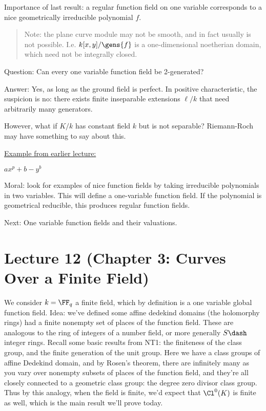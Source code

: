 Importance of last result: a regular function field on one variable
corresponds to a nice geometrically irreducible polynomial \(f\).

\begin{quote}
Note: the plane curve module may not be smooth, and in fact usually is
not possible. I.e. \(k[x ,y]/\gens{f}\) is a one-dimensional noetherian
domain, which need not be integrally closed.
\end{quote}

Question: Can every one variable function field be 2-generated?

Answer: Yes, as long as the ground field is perfect. In positive
characteristic, the suspicion is no: there exists finite inseparable
extensions \(\ell/k\) that need arbitrarily many generators.

However, what if \(K/k\) has constant field \(k\) but is not separable?
Riemann-Roch may have something to say about this.

\begin{example}

\hyperref[technical_example]{Example from earlier lecture:}

\(ax^p + b - y^b\)

\end{example}

Moral: look for examples of nice function fields by taking irreducible
polynomials in two variables. This will define a one-variable function
field. If the polynomial is geometrical reducible, this produces regular
function fields.

Next: One variable function fields and their valuations.

\hypertarget{lecture-12-chapter-3-curves-over-a-finite-field}{%
\section{Lecture 12 (Chapter 3: Curves Over a Finite
Field)}\label{lecture-12-chapter-3-curves-over-a-finite-field}}

We consider \(k= \FF_q\) a finite field, which by definition is a one
variable global function field. Idea: we've defined some affine dedekind
domains (the holomorphy rings) had a finite nonempty set of places of
the function field. These are analogous to the ring of integers of a
number field, or more generally \(S\dash\)integer rings. Recall some
basic results from NT1: the finiteness of the class group, and the
finite generation of the unit group. Here we have a class groups of
affine Dedekind domain, and by Rosen's theorem, there are infinitely
many as you vary over nonempty subsets of places of the function field,
and they're all closely connected to a geometric class group: the degree
zero divisor class group. Thus by this analogy, when the field is
finite, we'd expect that \(\Cl^0(K)\) is finite as well, which is the
main result we'll prove today.

